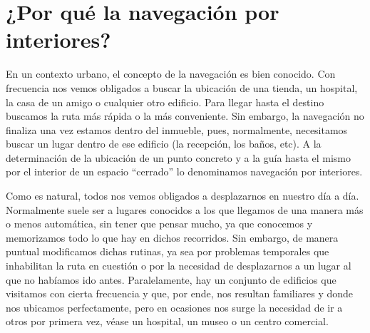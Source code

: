 



\section{¿Por qué la navegación por interiores?}

En un contexto urbano, el concepto de la navegación es bien conocido. Con frecuencia nos vemos obligados a buscar la ubicación de una tienda, un hospital, la casa de un amigo o cualquier otro edificio. Para llegar hasta el destino buscamos la ruta más rápida o la más conveniente. Sin embargo, la navegación no finaliza una vez estamos dentro del inmueble, pues, normalmente, necesitamos buscar un lugar dentro de ese edificio (la recepción, los baños, etc). A la determinación de la ubicación de un punto concreto y a la guía hasta el mismo por el interior de un espacio ``cerrado'' lo denominamos navegación por interiores.

Como es natural, todos nos vemos obligados a desplazarnos en nuestro día a día. Normalmente suele ser a lugares conocidos a los que llegamos de una manera más o menos automática, sin tener que pensar mucho, ya que conocemos y memorizamos todo lo que hay en dichos recorridos. Sin embargo, de manera puntual modificamos dichas rutinas, ya sea por problemas temporales que inhabilitan la ruta en cuestión o por la necesidad de desplazarnos a un lugar al que no habíamos ido antes. Paralelamente, hay un conjunto de edificios que visitamos con cierta frecuencia y que, por ende, nos resultan familiares y donde nos ubicamos perfectamente, pero en ocasiones nos surge la necesidad de ir a otros por primera vez, véase un hospital, un museo o un centro comercial. 

